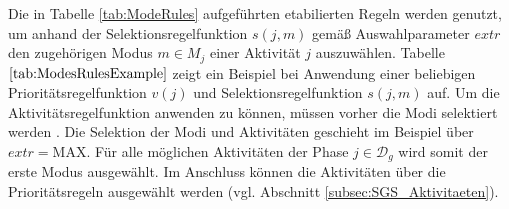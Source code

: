 \begin{table}[H]
\centering
{}%
\caption{Selektionsregeln für Modi}
\label{tab:ModeRules}
\end{table}

Die in Tabelle \ref{tab:ModeRules} aufgeführten etabilierten Regeln werden genutzt, um anhand der Selektionsregelfunktion $s(j, m)$ gemäß Auswahlparameter $extr$ den zugehörigen Modus $m \in M_j$ einer Aktivität $j$ auszuwählen. Tabelle $\ref{tab:ModesRulesExample}$ zeigt ein Beispiel bei Anwendung einer beliebigen Prioritätsregelfunktion $v(j)$ und Selektionsregelfunktion $s(j, m)$ auf. Um die Aktivitätsregelfunktion anwenden zu können, müssen vorher die Modi selektiert werden \cite[vgl.][S. 5046]{chen_entropy-based_2014}. Die Selektion der Modi und Aktivitäten geschieht im Beispiel über $extr = \text{MAX}$. Für alle möglichen Aktivitäten der Phase $j \in \mathcal{D}_g$ wird somit der erste Modus ausgewählt. Im Anschluss können die Aktivitäten über die Prioritätsregeln ausgewählt werden (vgl. Abschnitt \ref{subsec:SGS_Aktivitaeten}). 


